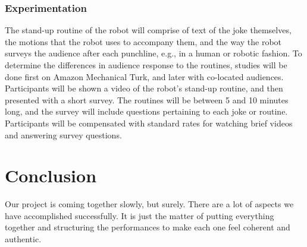 ﻿\documentclass[onecolumn, draftclsnofoot,10pt, compsoc]{IEEEtran}
\begin{document}
\subsubsection{Experimentation}
The stand-up routine of the robot will comprise of text of the joke themselves, the motions that the robot uses to accompany them, and the way the robot surveys the audience after each punchline, e.g., in a human or robotic fashion.
To determine the differences in audience response to the routines, studies will be done first on Amazon Mechanical Turk, and later with co-located audiences.
Participants will be shown a video of the robot's stand-up routine, and then presented with a short survey.
The routines will be between 5 and 10 minutes long, and the survey will include questions pertaining to each joke or routine.
Participants will be compensated with standard rates for watching brief videos and answering survey questions.


\section{Conclusion}

Our project is coming together slowly, but surely. There are a lot of aspects we have accomplished successfully. It is just the matter of putting everything together and structuring the performances to make each one feel coherent and authentic.

\pagebreak


% 
% 
\end{document}
